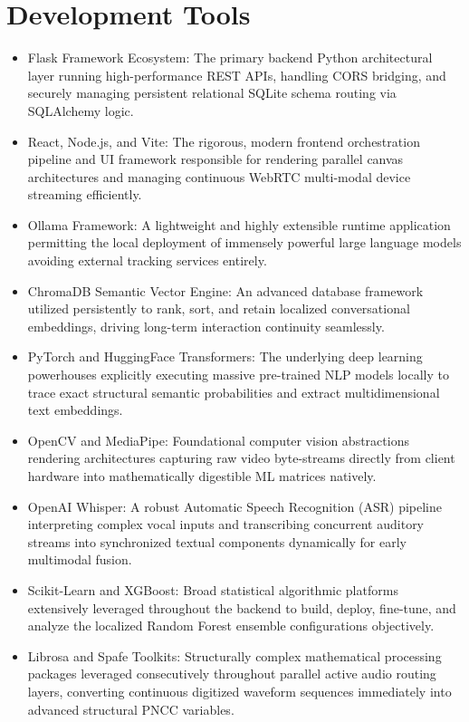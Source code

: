 \documentclass[11pt]{report}
\begin{document}
\section{Development Tools}
\begin{itemize}
    \item Flask Framework Ecosystem: The primary backend Python architectural layer running high-performance REST APIs, handling CORS bridging, and securely managing persistent relational SQLite schema routing via SQLAlchemy logic.
    \item React, Node.js, and Vite: The rigorous, modern frontend orchestration pipeline and UI framework responsible for rendering parallel canvas architectures and managing continuous WebRTC multi-modal device streaming efficiently.
    \item Ollama Framework: A lightweight and highly extensible runtime application permitting the local deployment of immensely powerful large language models avoiding external tracking services entirely.
    \item ChromaDB Semantic Vector Engine: An advanced database framework utilized persistently to rank, sort, and retain localized conversational embeddings, driving long-term interaction continuity seamlessly.
    \item PyTorch and HuggingFace Transformers: The underlying deep learning powerhouses explicitly executing massive pre-trained NLP models locally to trace exact structural semantic probabilities and extract multidimensional text embeddings.
    \item OpenCV and MediaPipe: Foundational computer vision abstractions rendering architectures capturing raw video byte-streams directly from client hardware into mathematically digestible ML matrices natively.
    \item OpenAI Whisper: A robust Automatic Speech Recognition (ASR) pipeline interpreting complex vocal inputs and transcribing concurrent auditory streams into synchronized textual components dynamically for early multimodal fusion.
    \item Scikit-Learn and XGBoost: Broad statistical algorithmic platforms extensively leveraged throughout the backend to build, deploy, fine-tune, and analyze the localized Random Forest ensemble configurations objectively.
    \item Librosa and Spafe Toolkits: Structurally complex mathematical processing packages leveraged consecutively throughout parallel active audio routing layers, converting continuous digitized waveform sequences immediately into advanced structural PNCC variables.
\end{itemize}
\end{document}

